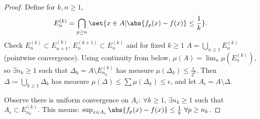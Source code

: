 \documentclass{article}
\begin{document}
\begin{proof}
    Define for $k, n \geq 1$,
    \begin{equation*}
        E_n^{(k)} = \bigcap_{p \geq n} \set{x \in A | \abs{f_p(x) - f(x)} \leq \frac{1}{k}}.
    \end{equation*}
    Check $E_n^{(k)} \subset E_{n+1}^{(k)}$, $E_n^{(k+1)} \subset E_n^{(k)}$ and for fixed $k \geq 1$ $A = \bigcup_{n \geq 1} E_n^{(k)}$ (pointwise convergence).
    Using continuity from below, $\mu(A) = \lim_n \mu(E_n^{(k)})$, so $\exists {n_k \geq 1}$ such that $\Delta_k = A \setminus E_{n_k}^{(k)}$ has measure $\mu(\Delta_k) \leq \frac{\epsilon}{2^k}$.
    Then $\Delta \coloneqq \bigcup_{k \geq 1} \Delta_k$ has measure $\mu(\Delta) \leq \sum \mu(\Delta_k) \leq \epsilon$, and let $A_\epsilon = A \setminus \Delta$.

    Observe there is uniform convergence on $A_\epsilon$: $\forall k \geq 1$, $\exists n_k \geq 1$ such that $A_\epsilon \subset E_{n_k}^{(k)}$.
    This means: $\sup_{x \in A_\epsilon} \abs{f_p(x) - f(x)} \leq \frac{1}{k} \ \forall p \geq n_k$.
\end{proof}
\end{document}
